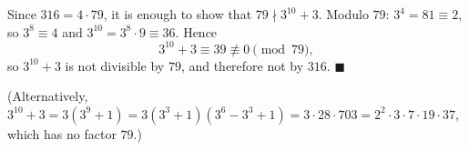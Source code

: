 Since $316=4\cdot79$, it is enough to show that $79\nmid3^{10}+3$. Modulo $79$: $3^4=81\equiv2$, so $3^8\equiv4$ and $3^{10}=3^8\cdot9\equiv36$. Hence
\[3^{10}+3\equiv39\not\equiv0\pmod{79},\]
so $3^{10}+3$ is not divisible by $79$, and therefore not by $316$. $\blacksquare$

(Alternatively, $3^{10}+3=3\left(3^9+1\right)=3\left(3^3+1\right)\left(3^6-3^3+1\right)=3\cdot28\cdot703=2^2\cdot3\cdot7\cdot19\cdot37$, which has no factor $79$.)
